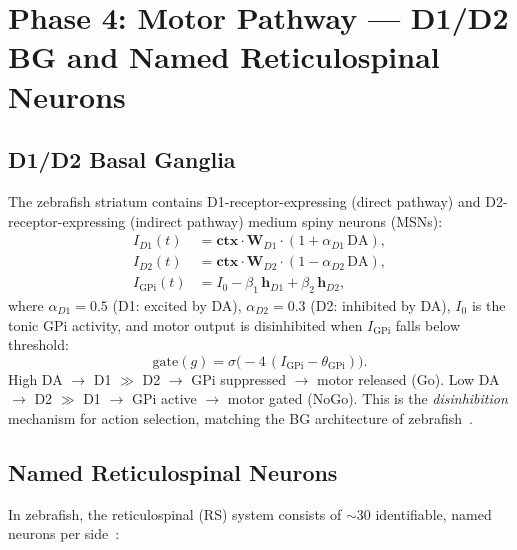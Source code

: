 \documentclass[11pt,a4paper]{article}
\begin{document}
\section{Phase 4: Motor Pathway --- D1/D2 BG and Named Reticulospinal Neurons}\label{sec:phase4}

\subsection{D1/D2 Basal Ganglia}

The zebrafish striatum contains D1-receptor-expressing (direct pathway) and
D2-receptor-expressing (indirect pathway) medium spiny neurons (MSNs):
\begin{equation}\label{eq:bg_d1d2}
\boxed{
\begin{aligned}
  I_{D1}(t) &= \mathbf{ctx} \cdot \mathbf{W}_{D1} \cdot (1 + \alpha_{D1}\,\text{DA}), \\
  I_{D2}(t) &= \mathbf{ctx} \cdot \mathbf{W}_{D2} \cdot (1 - \alpha_{D2}\,\text{DA}), \\
  I_\text{GPi}(t) &= I_0 - \beta_1\,\mathbf{h}_{D1} + \beta_2\,\mathbf{h}_{D2},
\end{aligned}
}
\end{equation}
where $\alpha_{D1} = 0.5$ (D1: excited by DA), $\alpha_{D2} = 0.3$ (D2: inhibited by DA),
$I_0$ is the tonic GPi activity, and motor output is disinhibited when
$I_\text{GPi}$ falls below threshold:
\begin{equation}
  \text{gate}(g) = \sigma\bigl(-4\,(I_\text{GPi} - \theta_\text{GPi})\bigr).
\end{equation}
High DA $\to$ D1 $\gg$ D2 $\to$ GPi suppressed $\to$ motor released (Go).
Low DA $\to$ D2 $\gg$ D1 $\to$ GPi active $\to$ motor gated (NoGo).
This is the \emph{disinhibition} mechanism for action selection, matching
the BG architecture of zebrafish~\cite{wolf2009}.

\subsection{Named Reticulospinal Neurons}

In zebrafish, the reticulospinal (RS) system consists of $\sim$30 identifiable,
named neurons per side~\cite{orger2008}:
\end{document}
